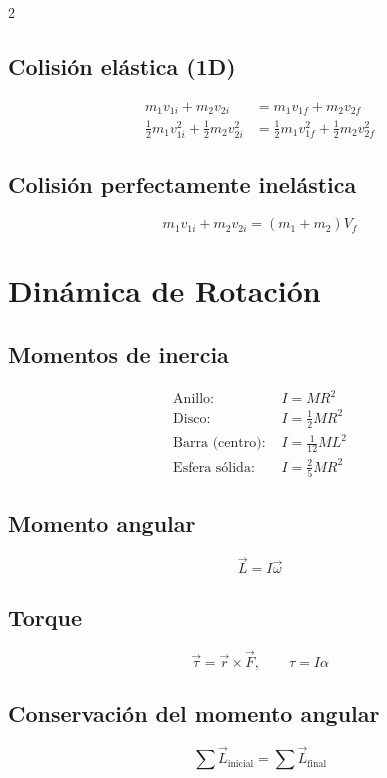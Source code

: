 \documentclass[10pt]{article}
\begin{document}
\begin{multicols}{2}
\subsection*{Colisión elástica (1D)}
\begin{align*}
    m_1 v_{1i} + m_2 v_{2i} &= m_1 v_{1f} + m_2 v_{2f} \\
    \tfrac{1}{2}m_1 v_{1i}^2 + \tfrac{1}{2}m_2 v_{2i}^2 &= \tfrac{1}{2}m_1 v_{1f}^2 + \tfrac{1}{2}m_2 v_{2f}^2
\end{align*}

\subsection*{Colisión perfectamente inelástica}
\[
m_1 v_{1i} + m_2 v_{2i} = (m_1+m_2) V_f
\]

\section*{Dinámica de Rotación}

\subsection*{Momentos de inercia}
\begin{align*}
    \text{Anillo: } & I = M R^2 \\
    \text{Disco: } & I = \tfrac{1}{2} M R^2 \\
    \text{Barra (centro): } & I = \tfrac{1}{12} M L^2 \\
    \text{Esfera sólida: } & I = \tfrac{2}{5} M R^2
\end{align*}

\subsection*{Momento angular}
\[
\vec{L} = I \vec{\omega}
\]

\subsection*{Torque}
\[
\vec{\tau} = \vec{r} \times \vec{F},\qquad \tau = I \alpha
\]

\subsection*{Conservación del momento angular}
\[
\sum \vec{L}_{\text{inicial}} = \sum \vec{L}_{\text{final}}
\]


\end{multicols}
\end{document}

